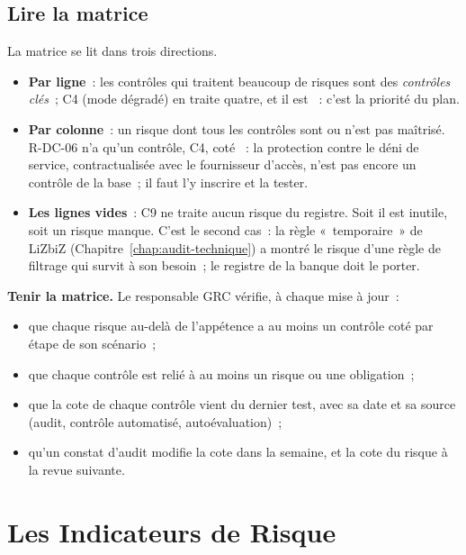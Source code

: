 \subsection{Lire la matrice}

La matrice se lit dans trois directions.
\begin{itemize}
    \item \textbf{Par ligne}~: les contrôles qui traitent beaucoup de risques
          sont des \emph{contrôles clés}~; C4 (mode dégradé) en traite
          quatre, et il est \NON{}~: c'est la priorité du plan.
    \item \textbf{Par colonne}~: un risque dont tous les contrôles sont
          \NON{} ou \NEK{} n'est pas maîtrisé. R-DC-06 n'a qu'un contrôle,
          C4, coté \NON{}~: la protection contre le déni de service,
          contractualisée avec le fournisseur d'accès, n'est pas encore un
          contrôle de la base~; il faut l'y inscrire et la tester.
    \item \textbf{Les lignes vides}~: C9 ne traite aucun risque du registre.
          Soit il est inutile, soit un risque manque. C'est le second cas~:
          la règle «~temporaire~» de LiZbiZ (Chapitre~\ref{chap:audit-technique})
          a montré le risque d'une règle de filtrage qui survit à son besoin~;
          le registre de la banque doit le porter.
\end{itemize}

\begin{boxprocedure}
\textbf{Tenir la matrice.} Le responsable GRC vérifie, à chaque mise à
jour~:
\begin{itemize}
    \item que chaque risque au-delà de l'appétence a au moins un contrôle
          coté \OUI{} par étape de son scénario~;
    \item que chaque contrôle est relié à au moins un risque ou une
          obligation~;
    \item que la cote de chaque contrôle vient du dernier test, avec sa
          date et sa source (audit, contrôle automatisé, autoévaluation)~;
    \item qu'un constat d'audit modifie la cote dans la semaine, et la cote
          du risque à la revue suivante.
\end{itemize}
\end{boxprocedure}

\section{Les Indicateurs de Risque}
\label{sec:c13-kri}


